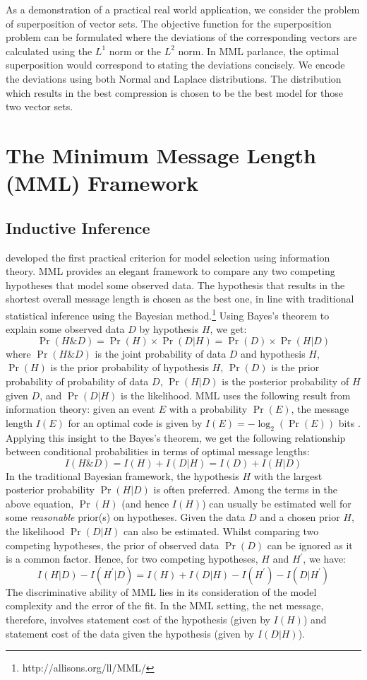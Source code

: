 \documentclass[wcp]{jmlr}
\begin{document}
As a demonstration of a practical real world application, we consider the problem of
superposition of vector sets. The objective function for the superposition problem can be formulated
where the deviations of the corresponding vectors are calculated using the $L^1$ norm 
or the $L^2$ norm. In MML parlance, the optimal superposition would correspond to stating
the deviations concisely. We encode the deviations using both Normal and Laplace
distributions. The distribution which results in the best compression is chosen
to be the best model for those two vector sets.

\section{The Minimum Message Length (MML) Framework}
\subsection{Inductive Inference}
\citet{wallace68} developed the first practical criterion for model selection using 
information theory. MML provides an elegant framework to compare any two competing 
hypotheses that model some observed data. The hypothesis that results in the shortest 
overall message length is chosen as the best one, in line with traditional statistical 
inference using the Bayesian method.\footnote{http://allisons.org/ll/MML/} Using 
Bayes's theorem to explain some observed data $D$ by hypothesis $H$, we get:
$$\Pr(H\&D) = \Pr(H) \times \Pr(D|H) = \Pr(D) \times \Pr(H|D)$$
where $\Pr(H\&D)$ is the joint probability of data $D$ and hypothesis $H$, $\Pr(H)$
is the prior probability of hypothesis $H$, $\Pr(D)$ is the prior probability of 
probability of data $D$, $\Pr(H|D)$ is the posterior probability of $H$
given $D$, and $\Pr(D|H)$ is the likelihood.
MML uses the following result from information theory: given an event $E$
with a probability $\Pr(E)$, the message length $I(E)$ for an optimal
code is given by $I(E) = -\log_2 (\Pr(E))$ bits \citep{shannon1948}. Applying this insight
to the Bayes's theorem, we get the following relationship between
conditional probabilities in terms of optimal message lengths:\[I(H\&D) = I(H) + I(D|H) = I(D) + I(H|D)\]
In the traditional Bayesian framework, the hypothesis $H$ with
the largest posterior probability $\Pr(H|D)$ is often preferred.
Among the terms in the above equation, $\Pr(H)$ (and hence $I(H)$) can
usually be estimated well for some \emph{reasonable} prior(s) on hypotheses.
Given the data $D$ and a chosen prior $H$, the likelihood $\Pr(D|H)$ can also be estimated.
Whilst comparing two competing hypotheses, the prior of observed data $\Pr(D)$
can be ignored as it is a common factor. Hence, for two competing hypotheses, $H$ and $H^\prime$, we have:
$$I(H|D) - I(H^\prime|D) = I(H) + I(D|H) - I(H^\prime) - I(D|H^\prime)$$
The discriminative ability of MML lies in its consideration of the model
complexity and the error of the fit. In the MML setting, the net message,
therefore, involves statement cost of the hypothesis
(given by $I(H)$) and statement cost of the data given the hypothesis (given by $I(D|H)$). 
\end{document}
